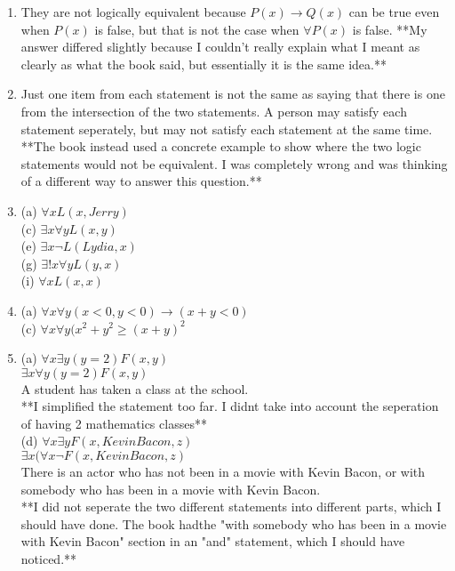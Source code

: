 \documentclass{article}
\begin{document}
\begin{enumerate}
\item They are not logically equivalent because $P(x) \rightarrow Q(x)$ can be true even when $P(x)$ is false, but that is not the case when $\forall P(x)$ is false.  **My answer differed slightly because I couldn't really explain what I meant as clearly as what the book said, but essentially it is the same idea.**

\item Just one item from each statement is not the same as saying that there is one from the intersection of the two statements. A person may satisfy each statement seperately, but may not satisfy each statement at the same time. \\
**The book instead used a concrete example to show where the two logic statements would not be equivalent. I was completely wrong and was thinking of a different way to answer this question.**

\item 
 (a) $\forall xL(x,Jerry)$ \\
 (c) $\exists x \forall y L(x,y)$ \\
 (e) $\exists x \neg L(Lydia,x)$ \\
 (g) $\exists !x \forall y L(y,x)$ \\
 (i) $\forall x L(x,x)$ 

\item 
 (a) $\forall x \forall y (x<0, y<0) \rightarrow (x+y <0)$ \\
 (c) $\forall x \forall y (x^2 + y^2 \geq (x+y)^2$

\item
 (a) $\forall x \exists y (y=2)F(x,y)$ \\
	$\exists x \forall y (y=2) F(x,y)$ \\
	A student has taken a class at the school. \\
 	**I simplified the statement too far. I didnt take into account the seperation of having 2 mathematics classes** \\

 (d) $\forall x \exists y F(x, Kevin Bacon, z)$ \\
	$\exists x(\forall x \neg F(x,Kevin Bacon, z)$ \\
	There is an actor who has not been in a movie with Kevin Bacon, or with somebody who has been in a movie with Kevin Bacon. \\
	**I did not seperate the two different statements into different parts, which I should have done. The book hadthe "with somebody who has been in a movie with Kevin Bacon" section in an "and" statement, which I should have noticed.**


\end{enumerate}
\end{document}
